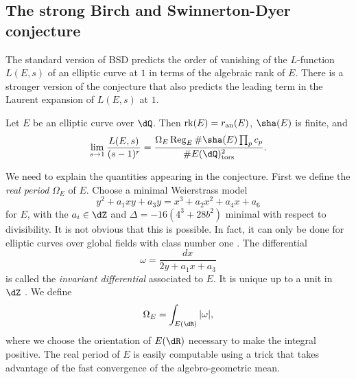 \subsection{The strong Birch and Swinnerton-Dyer conjecture}

The standard version of BSD predicts the order of vanishing of the 
$L$-function $L(E,s)$ of an elliptic curve at $1$ in terms of the algebraic 
rank of $E$. There is a stronger version of the conjecture that also predicts 
the leading term in the Laurent expansion of $L(E,s)$ at $1$. 

\begin{conjecture}
Let $E$ be an elliptic curve over $\dQ$. Then 
$\operatorname{rk}(E)=r_\textnormal{an}(E)$, $\sha(E)$ is finite, and 
\[
  \lim_{s\to 1} \frac{L(E,s)}{(s-1)^r} = \frac{\Omega_E \regulator_E \# \sha(E) \prod_p c_p}{\# E(\dQ)_\textnormal{tors}^2} \text{.}
\]
\end{conjecture}

We need to explain the quantities appearing in the conjecture. 
First we define the \emph{real period} $\Omega_E$ of $E$. Choose a minimal 
Weierstrass model 
\[
  y^2+a_1 xy+a_3 y=x^3+a_2 x^2+a_4 x+a_6
\]
for $E$, with the $a_i\in \dZ$ and $\Delta=-16(4 ^3+28 b^2)$ minimal with 
respect to divisibility. It is not obvious that this is possible. In fact, it 
can only be done for elliptic curves over global fields with class number one 
\cite[VIII.8.3]{si06}. The differential 
\[
  \omega = \frac{dx}{2 y + a_1 x + a_3}
\]
is called the \emph{invariant differential} associated to $E$. It is unique 
up to a unit in $\dZ$ \cite[VII.1.3]{si06}. We define 
\[
  \Omega_E = \int_{E(\dR)} |\omega|\text{,}
\]
where we choose the orientation of $E(\dR)$ necessary to make the integral 
positive. The real period of $E$ is easily computable using a trick that 
takes advantage of the fast convergence of the algebro-geometric mean. 

